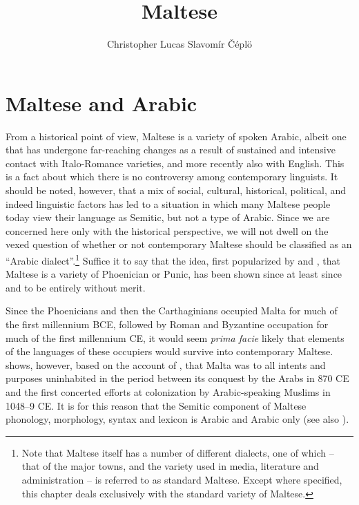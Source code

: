 \documentclass[output=paper]{langsci/langscibook}
\title{Maltese}
\author{Christopher Lucas\affiliation{SOAS University of London}\lastand 
 Slavomír Čéplö\affiliation{Institute of Oriental Studies, Slovak Academy of Sciences / IMAFO Abteilung Byzanzforschung, Österreichische Akademie der Wissenschaften}
}
\begin{document}
\maketitle
\section{Maltese and Arabic} %
From a historical point of view, Maltese is a variety of spoken Arabic, albeit one that has undergone far-reaching changes as a result of sustained and intensive contact with Italo-Romance varieties, and more recently also with English. This is a fact about which there is no controversy among contemporary linguists. It should be noted, however, that a mix of social, cultural, historical, political, and indeed linguistic factors has led to a situation in which many Maltese people today view their language as Semitic, but not a type of Arabic. Since we are concerned here only with the historical perspective, we will not dwell on the vexed question of whether or not contemporary Maltese should be classified as an ``Arabic dialect''.\footnote{Note that Maltese itself has a number of different dialects, one of which -- that of the major towns, and the variety used in media, literature and administration -- is referred to as standard Maltese. Except where specified, this chapter deals exclusively with the standard variety of Maltese.} Suffice it to say that the idea, first popularized by \cite{desoldanis1750} and \cite{vassalli1791}, that Maltese is a variety of Phoenician or Punic, has been shown since at least since \cite{gesenius1810} and \cite{desacy1829} to be entirely without merit.

Since the Phoenicians and then the Carthaginians occupied Malta for much of the first millennium BCE, followed by Roman and Byzantine occupation for much of the first millennium CE, it would seem \textit{prima facie} likely that elements of the languages of these occupiers would survive into contemporary Maltese. \cite{brincat1995} shows, however, based on the account of , that Malta was to all intents and purposes uninhabited in the period between its conquest by the Arabs in 870 CE and the first concerted efforts at colonization by Arabic-speaking Muslims in 1048--9 CE. It is for this reason that the Semitic component of Maltese phonology, morphology, syntax and lexicon is Arabic and Arabic only (see also \citealt{grech1961}).
\end{document}
